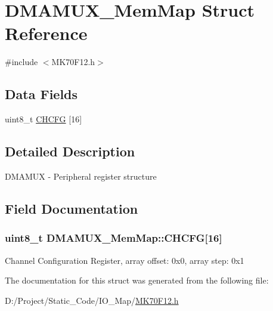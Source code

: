 \hypertarget{struct_d_m_a_m_u_x___mem_map}{}\section{D\+M\+A\+M\+U\+X\+\_\+\+Mem\+Map Struct Reference}
\label{struct_d_m_a_m_u_x___mem_map}


{\ttfamily \#include $<$M\+K70\+F12.\+h$>$}

\subsection*{Data Fields}
\begin{DoxyCompactItemize}
\item 
uint8\+\_\+t \hyperlink{struct_d_m_a_m_u_x___mem_map_a7ba04adde18230ace5b01e6b01725638}{C\+H\+C\+F\+G} \mbox{[}16\mbox{]}
\end{DoxyCompactItemize}


\subsection{Detailed Description}
D\+M\+A\+M\+U\+X -\/ Peripheral register structure 

\subsection{Field Documentation}
\hypertarget{struct_d_m_a_m_u_x___mem_map_a7ba04adde18230ace5b01e6b01725638}{}
\subsubsection[{C\+H\+C\+F\+G}]{\setlength{\rightskip}{0pt plus 5cm}uint8\+\_\+t D\+M\+A\+M\+U\+X\+\_\+\+Mem\+Map\+::\+C\+H\+C\+F\+G\mbox{[}16\mbox{]}}\label{struct_d_m_a_m_u_x___mem_map_a7ba04adde18230ace5b01e6b01725638}
Channel Configuration Register, array offset\+: 0x0, array step\+: 0x1 

The documentation for this struct was generated from the following file\+:\begin{DoxyCompactItemize}
\item 
D\+:/\+Project/\+Static\+\_\+\+Code/\+I\+O\+\_\+\+Map/\hyperlink{_m_k70_f12_8h}{M\+K70\+F12.\+h}\end{DoxyCompactItemize}
